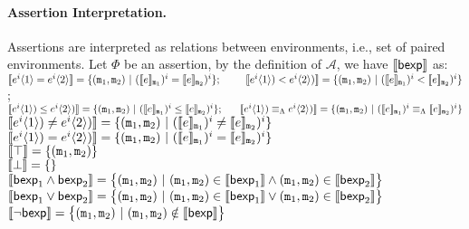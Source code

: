 \documentclass[a4paper,11pt]{article}
\begin{document}
\paragraph{Assertion Interpretation.} Assertions are interpreted as relations between environments, i.e., set of paired environments. Let $\Phi$ be an assertion,
%
by the definition of $\mathcal{A}$, we have $\llbracket \mathsf{bexp} \rrbracket$ as:
\\
$\sem{\expr^i\langle 1 \rangle 
= \expr^i\langle 2 \rangle} = 
\{(\trsmem_1, \trsmem_2) 
~|~ (\sem{\expr}_{\trsmem_{1}})^i 
= \sem{\expr}_{\trsmem_2})^i \};
%
~~~~~~~
\sem{\expr^i\langle 1 \rangle) 
< \expr^i\langle 2 \rangle)} = 
\{(\trsmem_1, \trsmem_2) ~|~ (\sem{\expr}_{\trsmem_{1}})^i 
< \sem{\expr}_{\trsmem_2})^i \}$;
%
\\
$\sem{\expr^i\langle 1 \rangle) 
\leq \expr^i\langle 2 \rangle)} = 
\{(\trsmem_1, \trsmem_2) ~|~ (\sem{\expr}_{\trsmem_{1}})^i 
\leq \sem{\expr}_{\trsmem_2})^i \};
%
~~~~~
\sem{\expr^i\langle 1 \rangle) 
\lameq \expr^i\langle 2 \rangle)} = 
\{(\trsmem_1, \trsmem_2) ~|~ (\sem{\expr}_{\trsmem_{1}})^i 
\lameq \sem{\expr}_{\trsmem_2})^i \}$
%
\\
$\llbracket e^i\langle 1 \rangle) 
\neq e^i\langle 2 \rangle) \rrbracket = 
\{(\mathtt{m}_1, \mathtt{m}_2) ~|~ (\llbracket e \rrbracket_{\mathtt{m}_{1}})^i 
\neq \llbracket e \rrbracket_{\mathtt{m}_2})^i \}$
%
\\
$\llbracket e^i\langle 1 \rangle) 
= e^i\langle 2 \rangle) \rrbracket = 
\{(\mathtt{m}_1, \mathtt{m}_2) ~|~ (\llbracket e \rrbracket_{\mathtt{m}_{1}})^i 
= \llbracket e \rrbracket_{\mathtt{m}_2})^i \}$
%
\\
$\llbracket \top \rrbracket = \{(\mathtt{m}_1, \mathtt{m}_2)\}$
%
\\
$\llbracket \bot \rrbracket = \{\}$
%
\\
$\llbracket \mathsf{bexp}_1 \land \mathsf{bexp}_2 \rrbracket = \big\{(\mathtt{m}_1, \mathtt{m}_2)
~|~ (\mathtt{m}_1, \mathtt{m}_2) \in \llbracket \mathsf{bexp}_1 \rrbracket \land 
	(\mathtt{m}_1, \mathtt{m}_2) \in \llbracket \mathsf{bexp}_2 \rrbracket \big\}$
%
\\
$\llbracket \mathsf{bexp}_1 \lor \mathsf{bexp}_2 \rrbracket = \big\{(\mathtt{m}_1, \mathtt{m}_2)
~|~ (\mathtt{m}_1, \mathtt{m}_2) \in \llbracket \mathsf{bexp}_1 \rrbracket \lor 
	(\mathtt{m}_1, \mathtt{m}_2) \in \llbracket \mathsf{bexp}_2 \rrbracket \big\}$
%
\\
$\llbracket \neg \mathsf{bexp} \rrbracket = \big\{(\mathtt{m}_1, \mathtt{m}_2)
~|~ (\mathtt{m}_1, \mathtt{m}_2) \notin \llbracket \mathsf{bexp} \rrbracket \big\}$
%
%
%
\end{document}

